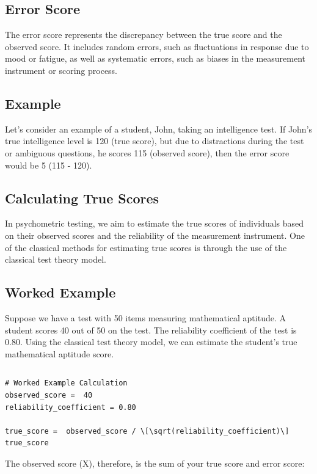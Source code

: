 \documentclass[12pt, a4paper]{exam}
\begin{document}
\subsection{Error Score}

The error score represents the discrepancy between the true score and the observed score. It includes random errors, such as fluctuations in response due to mood or fatigue, as well as systematic errors, such as biases in the measurement instrument or scoring process.

\subsection{Example}

Let’s consider an example of a student, John, taking an intelligence test. If John’s true intelligence level is 120 (true score), but due to distractions during the test or ambiguous questions, he scores 115 (observed score), then the error score would be 5 (115 - 120).

\subsection{Calculating True Scores}

In psychometric testing, we aim to estimate the true scores of individuals based on their observed scores and the reliability of the measurement instrument. One of the classical methods for estimating true scores is through the use of the classical test theory model.

\subsection{Worked Example}

Suppose we have a test with 50 items measuring mathematical aptitude. A student scores 40 out of 50 on the test. The reliability coefficient of the test is 0.80. Using the classical test theory model, we can estimate the student’s true mathematical aptitude score.

\[
\]

\begin{verbatim}
# Worked Example Calculation
observed_score =  40
reliability_coefficient = 0.80

true_score =  observed_score / \[\sqrt(reliability_coefficient)\]
true_score
\end{verbatim}

The observed score (X), therefore, is the sum of your true score and error score:
\end{document}
